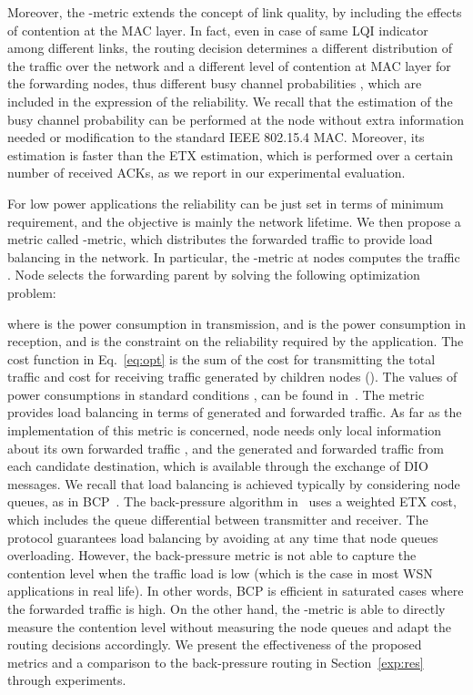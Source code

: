 \documentclass[review, 1p, 11pt]{elsarticle}
\numberwithin{equation}{section}
\begin{document}
Moreover, the -metric extends the concept of link quality, by including the effects of contention at the MAC layer. In fact, even in case of same LQI indicator among different links, the routing decision determines a different distribution of the traffic over the network and a different level of contention at MAC layer for the forwarding nodes, thus different busy channel probabilities , which are included in the expression of the reliability.
We recall that the estimation of the busy channel probability can be performed at the node without extra information needed or modification to the standard IEEE 802.15.4 MAC. Moreover, its estimation is faster than the ETX estimation, which is performed over a certain number of received ACKs, as we report in our experimental evaluation.


For low power applications the reliability can be just set in terms of minimum requirement, and the objective is mainly the network lifetime.
We then propose a metric called -metric, which distributes the forwarded traffic to provide load balancing in the network.
In particular, the -metric at nodes  computes the traffic . Node  selects the forwarding parent by solving the following optimization problem:

where  is the power consumption in transmission, and  is the power consumption in reception,  and  is the constraint on the reliability required by the application.
The cost function in Eq.~\eqref{eq:opt} is the sum of the cost for transmitting the total  traffic  and cost for receiving traffic generated by children nodes ().
The values of power consumptions in standard conditions ,  can be found in~\cite{Fourty}.
The metric provides load balancing in terms of generated and forwarded traffic.
As far as the implementation of this metric is concerned, node  needs only local information about its own forwarded traffic , and the generated and forwarded traffic from each candidate destination, which is available through the exchange of DIO messages.
We recall that load balancing is achieved typically by considering node queues, as in BCP~\cite{BCP}. The back-pressure algorithm in~\cite{BCP}  uses a weighted ETX cost, which includes the queue differential between transmitter and receiver.
The protocol guarantees load balancing by avoiding at any time that node queues overloading. However, the back-pressure metric is not able to capture the contention level when the traffic load is low (which is the case in most WSN applications in real life). In other words, BCP is efficient in saturated cases where the forwarded traffic is high.  On the other hand, the -metric is able to directly measure the contention level without measuring the node queues and adapt the routing decisions accordingly.
We present the effectiveness of the proposed metrics and a comparison to the back-pressure routing in Section~\ref{exp:res} through experiments.
\end{document}
